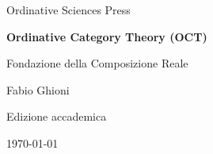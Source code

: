 \begin{titlepage}
\centering

{\Large Ordinative Sciences Press\par}
\vspace{1.2cm}

{\Huge \textbf{Ordinative Category Theory (OCT)}\par}
\vspace{0.4cm}
{\LARGE Fondazione della Composizione Reale\par}
\vspace{1.6cm}

{\Large Fabio Ghioni\par}
\vspace{0.8cm}

{\large Edizione accademica\par}
\vfill

{\large \today\par}

\end{titlepage}
